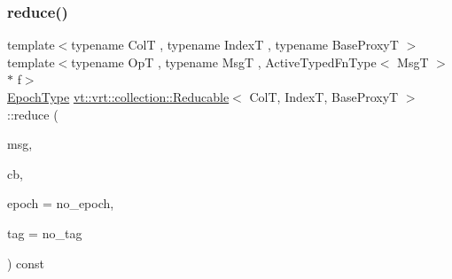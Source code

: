 \mbox{\label{structvt_1_1vrt_1_1collection_1_1_reducable_af049a8809d46da10f48d5fecbb1ace3d}} 
\subsubsection{\texorpdfstring{reduce()}{reduce()}\hspace{0.1cm}{\footnotesize\ttfamily [1/4]}}
{\footnotesize\ttfamily template$<$typename ColT , typename IndexT , typename Base\+ProxyT $>$ \\
template$<$typename OpT , typename MsgT , Active\+Typed\+Fn\+Type$<$ Msg\+T $>$ $\ast$ f$>$ \\
\hyperlink{namespacevt_a985a5adf291c34a3ca263b3378388236}{Epoch\+Type} \hyperlink{structvt_1_1vrt_1_1collection_1_1_reducable}{vt\+::vrt\+::collection\+::\+Reducable}$<$ ColT, IndexT, Base\+ProxyT $>$\+::reduce (\begin{DoxyParamCaption}\item[{MsgT $\ast$const}]{msg,  }\item[{\hyperlink{namespacevt_a36db99df4c973d48b1118a293fff533f}{Callback}$<$ MsgT $>$}]{cb,  }\item[{\hyperlink{namespacevt_a985a5adf291c34a3ca263b3378388236}{Epoch\+Type} const \&}]{epoch = {\ttfamily no\+\_\+epoch},  }\item[{\hyperlink{namespacevt_a84ab281dae04a52a4b243d6bf62d0e52}{Tag\+Type} const \&}]{tag = {\ttfamily no\+\_\+tag} }\end{DoxyParamCaption}) const}

\mbox{\label{structvt_1_1vrt_1_1collection_1_1_reducable_a4bd8f4179c7bfaddaac074a23e2c647b}} 
